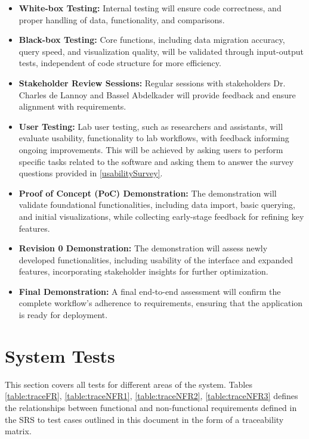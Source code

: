 \documentclass[12pt, titlepage]{article}
\begin{document}
\begin{itemize}
    \item \textbf{White-box Testing:} Internal testing will ensure code
    correctness, and proper handling of data, functionality, and comparisons.
    \item \textbf{Black-box Testing:} Core functions, including data migration
    accuracy, query speed, and visualization quality, will be validated through
    input-output tests, independent of code structure for more efficiency.
    \item \textbf{Stakeholder Review Sessions:} Regular sessions with
    stakeholders Dr. Charles de Lannoy and Bassel Abdelkader will provide
    feedback and ensure alignment with requirements.
    \item \textbf{User Testing:} Lab user testing, such as researchers and
    assistants, will evaluate usability, functionality to lab workflows, with
    feedback informing ongoing improvements. This will be achieved by asking
    users to perform specific tasks related to the software and asking them to
    answer the survey questions provided in \ref{usabilitySurvey}.
    \item \textbf{Proof of Concept (PoC) Demonstration:} The demonstration will
    validate foundational functionalities, including data import, basic
    querying, and initial visualizations, while collecting early-stage feedback
    for refining key features.
    \item \textbf{Revision 0 Demonstration:} The demonstration will assess newly
    developed functionalities, including usability of the interface and expanded
    features, incorporating stakeholder insights for further optimization.
    \item \textbf{Final Demonstration:} A final end-to-end assessment will
    confirm the complete workflow’s adherence to requirements, ensuring that the
    application is ready for deployment.
\end{itemize}

\section{System Tests} \label{systemTests}
This section covers all tests for different areas of the system. Tables
\ref{table:traceFR}, \ref{table:traceNFR1}, \ref{table:traceNFR2}, \ref{table:traceNFR3} defines the relationships between functional and
non-functional requirements defined in the SRS to test cases outlined in this
document in the form of a traceability matrix.
\end{document}
